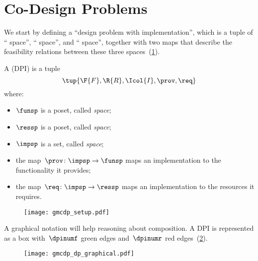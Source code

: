 
\section{Co-Design Problems}
\label{sec:Design-Problems}

We start by defining
a ``design problem with implementation'', which is a tuple of `` space'', `` space'', and `` space'', together with two maps that describe the feasibility relations between these three spaces~(\cref{fig:setup}).
\begin{definition}
  \label{def:DPI}A \emph{} (DPI) is a tuple
  \begin{equation}
    \tup{\F{F},\R{R},\Icol{I},\prov,\req}
  \end{equation}
  where:

  \begin{itemize}
    \item $\funsp$ is a poset, called \emph{ space};
    \item $\ressp$ is a poset, called \emph{ space};
    \item $\impsp$ is a set, called \emph{ space};
    \item the map~$\prov\colon\impsp\rightarrow\funsp$
    maps an implementation to the functionality it provides;
    \item the map~$\req\colon\impsp\rightarrow\ressp$
    maps an implementation to the resources it requires.
  \end{itemize}

  \begin{figure}[h]
    \begin{center}
      \texttt{[image: gmcdp\_setup.pdf]}
    \end{center}
    \caption{\label{fig:setup}}
  \end{figure}
\end{definition}


A graphical notation will help reasoning about composition. A DPI is represented as a box with~$\dpinumf$ green edges and~$\dpinumr$ red edges~(\cref{fig:dp_graphical}).

\begin{figure}[h]
  \centering
  \texttt{[image: gmcdp\_dp\_graphical.pdf]}
  \caption{\label{fig:dp_graphical}}
\end{figure}

